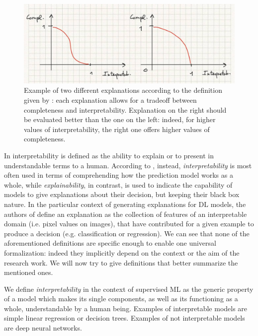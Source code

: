 \begin{figure}
	\centering
	\includegraphics[width=0.9\linewidth]{figures/example_explainability.png}
	\caption{Example of two different explanations according to the definition given by \cite{gilpin2018explaining}: each explanation allows for a tradeoff between completeness and interpretability. Explanation on the right should be evaluated better than the one on the left: indeed, for higher values of interpretability, the right one offers higher values of completeness.}
	\label{fig:example_explainability}
\end{figure}

In \cite{doshivelez2017rigorous} interpretability is defined as the ability to explain or to present in understandable terms to a human. According to \cite{burkart2021survey}, instead, \textit{interpretability} is most often used in terms of comprehending how the prediction model works as a whole, while \textit{explainability}, in contrast, is used to indicate the capability of models to give explanations about their decision, but keeping their black box nature. In the particular context of generating explanations for DL models, the authors of \cite{montavon2018methods} define an explanation as the collection of features of an interpretable domain (i.e. pixel values on images), that have contributed for a given example to produce a decision (e.g. classification or regression). We can see that none of the aforementioned definitions are specific enough to enable one universal formalization: indeed they implicitly  depend on the context or the aim of the research work. We will now try to give definitions that better summarize the mentioned ones.

\begin{definition}[Interpretability]
	\label{def:interpretability}
	We define \textit{interpretability} in the context of supervised ML as the generic property of a model which makes its single components, as well as its functioning as a whole, understandable by a human being. Examples of interpretable models are simple linear regression or decision trees. Examples of not interpretable models are deep neural networks.
\end{definition}


